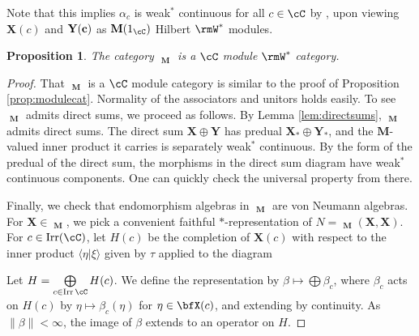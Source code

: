 \documentclass[11pt,reqno]{amsart}
\DeclareMathOperator{\Irr}{Irr}
\DeclareMathOperator{\CMod}{C^*Mod}
\DeclareMathOperator{\WMod}{W^*Mod}
\newcommand{\bb}[1]{\mathbf{#1}}
\newcommand{\bbover}[1]{\mathbf{\overline{#1}}}
\numberwithin{equation}{section}
\theoremstyle{plain}
\newtheorem{prop}[thm]{Proposition}
\begin{document}
Note that this implies $\alpha_c$ is weak$^*$ continuous for all $c \in \cC$ by \cite[Corollary~8.5.8]{BLM04}, upon viewing $\bb X(c)$ and $\bf Y(c)$ as $\bb M(1_{\cC})$ Hilbert $\rmW^*$ modules.

\begin{prop} \label{prop:WModWStar}
The category $\WMod_{\bb M}$ is a $\cC$ module $\rmW^*$ category.
\end{prop}

\begin{proof}
That $\WMod_{\bb M}$ is a $\cC$ module category is similar to the proof of Proposition \ref{prop:modulecat}.
Normality of the associators and unitors holds easily.
To see $\WMod_{\bb M}$ admits direct sums, we proceed as follows.
By Lemma \ref{lem:directsums}, $\CMod_{\bb M}$ admits direct sums.
The direct sum $\bb X \oplus \bb Y$ has predual $\bb X_* \oplus \bb Y_*$, and the $\bb M$-valued inner product it carries is separately weak$^*$ continuous.
By the form of the predual of the direct sum, the morphisms in the direct sum diagram have weak$^*$ continuous components.
One can quickly check the universal property from there.

Finally, we check that endomorphism algebras in $\WMod_{\bb M}$ are von Neumann algebras.
For $\bb X \in \WMod_{\bb M}$, we pick a convenient faithful $*$-representation of $N = \WMod_{\bb M}(\bb X, \bb X)$.
For $c \in \Irr(\cC)$, let $H(c)$ be the completion of $\bb X(c)$ with respect to the inner product $\langle \eta| \xi \rangle$ given by $\tau$ applied to the diagram
\begin{center}
\end{center}
Let $H = \bigoplus \limits_{c \in \Irr{\cC}} H(c)$.
We define the representation by $\beta \mapsto \bigoplus \beta_c$, where $\beta_c$ acts on $H(c)$ by $\eta \mapsto \beta_c(\eta)$ for $\eta \in \bfX(c)$, and extending by continuity.
As $\|\beta\| < \infty$, the image of $\beta$ extends to an operator on $H$.


\end{proof}
\end{document}
